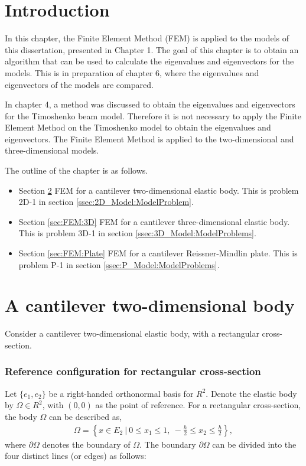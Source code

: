\documentclass[../../main.tex]{subfiles}
\begin{document}
\section{Introduction}
In this chapter, the Finite Element Method (FEM) is applied to the models of this dissertation, presented in Chapter 1. The goal of this chapter is to obtain an algorithm that can be used to calculate the eigenvalues and eigenvectors for the models. This is in preparation of chapter 6, where the eigenvalues and eigenvectors of the models are compared.

In chapter 4, a method was discussed to obtain the eigenvalues and eigenvectors for the Timoshenko beam model. Therefore it is not necessary to apply the Finite Element Method on the Timoshenko model to obtain the eigenvalues and eigenvectors. The Finite Element Method is applied to the two-dimensional and three-dimensional models.

The outline of the chapter is as follows.
\begin{itemize}
	\item[] Section \ref{sec:FEM:2D} FEM for a cantilever two-dimensional elastic body. This is problem 2D-1 in section \ref{ssec:2D_Model:ModelProblem}.
	\item[] Section \ref{sec:FEM:3D} FEM for a cantilever three-dimensional elastic body. This is problem 3D-1 in section \ref{ssec:3D_Model:ModelProblems}.
	\item[] Section \ref{sec:FEM:Plate} FEM for a cantilever Reissner-Mindlin plate. This is problem P-1 in section \ref{ssec:P_Model:ModelProblems}.
\end{itemize}

\section{A cantilever two-dimensional body} \label{sec:FEM:2D}
Consider a cantilever two-dimensional elastic body, with a rectangular cross-section.

\subsubsection{Reference configuration for rectangular cross-section}\label{sssec:2D_Model:RefConf}
Let $\{e_1,e_2\}$ be a right-handed orthonormal basis for $R^2$. Denote the elastic body by $\Omega \in R^2$, with $(0,0)$ as the point of reference. For a rectangular cross-section, the body $\Omega$ can be described as,
\begin{eqnarray*}
	\Omega = \left \{ x \in E_2 \ | \ 0 \leq x_1 \leq 1, \ -\frac{h}{2} \leq x_2 \leq \frac{h}{2} \right \},
\end{eqnarray*} where $\partial \Omega$ denotes the boundary of $\Omega$. The boundary $\partial \Omega$ can be divided into the four distinct lines (or edges) as follows: \label{sym:En}
\end{document}
